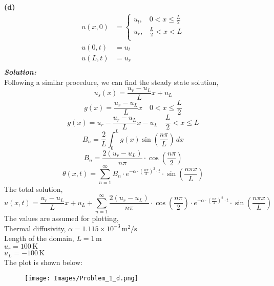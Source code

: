 \documentclass[]{article}
\theoremstyle{definition}
\begin{document}
\begin{enumerate}
\textbf{(d)}\quad
\begin{align*}
u(x,0) &= \begin{cases}
u_l, & 0 < x \leq \frac{L}{2} \\
u_r, & \frac{L}{2} < x < L \\
\end{cases}\\
u(0,t) &= u_l \\
u(L,t) &= u_r \\
\end{align*}
\emph{\textbf{Solution:}}\\
Following a similar procedure, we can find the steady state solution,
\[
u_s(x) = \frac{u_r - u_L}{L}x + u_L
\]
\[
g(x) = \frac{u_r - u_L}{L}x \quad 0<x\le \frac{L}{2}
\]
\[
g(x) = u_r - \frac{u_r - u_L}{L}x - u_L \quad \frac{L}{2}<x\le L
\]
\[
B_n = \frac{2}{L}\int_{0}^{L} g(x)\sin\left(\frac{n\pi}{L}\right) \,dx
\]
\[
\boxed{
B_n = \frac{{2(u_r - u_L)}}{{n\pi}} \cdot \cos\left(\frac{{n\pi}}{{2}}\right)
}
\]
\[
\boxed{
\theta(x,t) = \sum_{n=1}^{\infty} B_n \cdot e^{-\alpha \cdot \left(\frac{n\pi}{2}\right)^2 \cdot t} \cdot \sin\left(\frac{n\pi x}{L}\right)
}
\]
The total solution,
\[
\boxed{
u(x,t) = \frac{u_r - u_L}{L}x + u_L + \sum_{n=1}^{\infty} \frac{{2(u_r - u_L)}}{{n\pi}} \cdot \cos\left(\frac{{n\pi}}{{2}}\right) \cdot e^{-\alpha \cdot \left(\frac{n\pi}{2}\right)^2 \cdot t} \cdot \sin\left(\frac{n\pi x}{L}\right)
}
\]
The values are assumed for plotting, \\
Thermal diffusivity, $\alpha = 1.115 \times 10^{-3}\, \text{m}^2/\text{s}$ \\
Length of the domain, $L = 1\, \text{m}$ \\
$u_r = 100\, \text{K}$ \\
$u_L = -100\, \text{K}$ \\
The plot is shown below:\\
\begin{figure}[htbp]
    \centering
    \texttt{[image: Images/Problem\_1\_d.png]}
\end{figure}\\


\end{enumerate}
\end{document}
